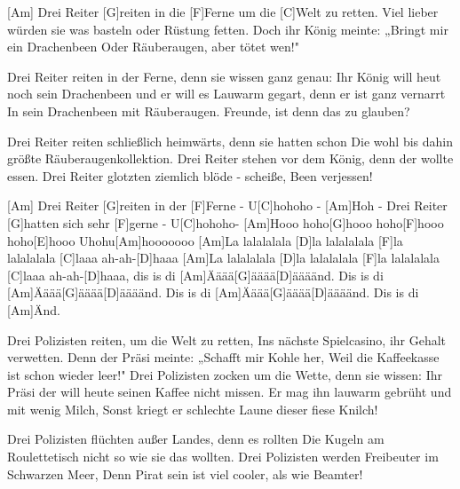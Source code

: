 

\begin{guitar}
	[Am] Drei Reiter [G]reiten in die [F]Ferne um die [C]Welt zu retten.
	Viel lieber würden sie was basteln oder Rüstung fetten.
	Doch ihr König meinte: „Bringt mir ein Drachenbeen
	Oder Räuberaugen, aber tötet wen!"
	
	Drei Reiter reiten in der Ferne, denn sie wissen ganz genau:
	Ihr König will heut noch sein Drachenbeen und er will es 
	Lauwarm gegart, denn er ist ganz vernarrt
	In sein Drachenbeen mit Räuberaugen. Freunde, ist denn das zu glauben?
	
	Drei Reiter reiten schließlich heimwärts, denn sie hatten schon
	Die wohl bis dahin größte Räuberaugenkollektion.
	Drei Reiter stehen vor dem König, denn der wollte essen.
	Drei Reiter glotzten ziemlich blöde - scheiße, Been verjessen!
	
	[Am] Drei Reiter [G]reiten in der [F]Ferne - U[C]hohoho -
	[Am]Hoh - Drei Reiter [G]hatten sich sehr [F]gerne - U[C]hohoho-
	[Am]Hooo hoho[G]hooo hoho[F]hooo hoho[E]hooo
	Uhohu[Am]hooooooo
	[Am]La lalalalala [D]la lalalalala [F]la lalalalala [C]laaa ah-ah-[D]haaa
	[Am]La lalalalala [D]la lalalalala [F]la lalalalala [C]laaa ah-ah-[D]haaa, dis is di 
	[Am]{Ä}äää[G]{ä}äää[D]{ä}ääänd. Dis is di 
	[Am]{Ä}äää[G]{ä}äää[D]{ä}ääänd. Dis is di 
	[Am]{Ä}äää[G]{ä}äää[D]{ä}ääänd. Dis is di 
	[Am]{Ä}nd.
	
	Drei Polizisten reiten, um die Welt zu retten,
	Ins nächste Spielcasino, ihr Gehalt verwetten.
	Denn der Präsi meinte: „Schafft mir Kohle her,
	Weil die Kaffeekasse ist schon wieder leer!"
	\pagebreak
	Drei Polizisten zocken um die Wette, denn sie wissen:
	Ihr Präsi der will heute seinen Kaffee nicht missen.
	Er mag ihn lauwarm gebrüht und mit wenig Milch,
	Sonst kriegt er schlechte Laune dieser fiese Knilch!
	
	Drei Polizisten flüchten außer Landes, denn es rollten
	Die Kugeln am Roulettetisch nicht so wie sie das wollten.
	Drei Polizisten werden Freibeuter im Schwarzen Meer,
	Denn Pirat sein ist viel cooler, als wie Beamter!
	
	 
\end{guitar}